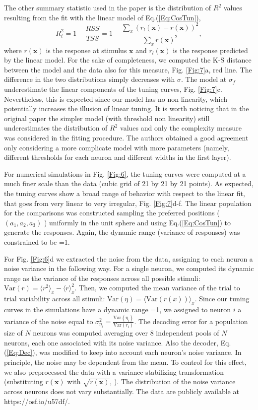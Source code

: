 \documentclass[a4paper]{article}
\begin{document}
The other summary statistic used in the paper is the distribution of $R^2$ values resulting from the fit with the linear model of Eq.(\ref{Eq:CosTun}),
\begin{equation}
R^2_i = 1- \frac{RSS}{TSS} = 1-\frac{\sum_x (r_l(\mathbf{x}) - r(\mathbf{x}))^2}{\sum_x r(\mathbf{x})^2},
\end{equation}
where $r(\mathbf{x})$ is the response at stimulus $\mathbf{x}$ and $r_l(\mathbf{x})$ is the response predicted by the linear model. For the sake of completeness, we computed the K-S distance between the model and the data also for this measure, Fig. \ref{Fig:7}a, red line. The difference in the two distributions simply decreases with $\sigma$. The model at $\sigma_f$ underestimate the linear components of the tuning curves, Fig. \ref{Fig:7}c. Nevertheless, this is expected since our model has no non linearity, which potentially increases the illusion of linear tuning. It is worth noticing that in the original paper the simpler model (with threshold non linearity) still underestimates the distribution of $R^2$ values and only the complexity measure was considered in the fitting procedure. The authors obtained a good agreement only considering  a more complicate model with more parameters (namely, different thresholds for each neuron and different widths in the first layer).

For numerical simulations in Fig. \ref{Fig:6}, the tuning curves were computed at a much finer scale than the data (cubic grid of 21 by 21 by 21 points).  As expected, the tuning curves show a broad range of behavior with respect to the linear fit, that goes from very linear to very irregular, Fig. \ref{Fig:7}d-f.
The linear population for the comparisons was constructed sampling the preferred positions ($(a_1,a_2,a_3)$ ) uniformly in the unit sphere and using Eq.(\ref{Eq:CosTun}) to generate the responses. Again, the dynamic range (variance of responses) was constrained to be =1. 

For Fig. \ref{Fig:6}d we extracted the noise from the data, assigning to each neuron a noise variance in the following way. For a single neuron, we computed its dynamic range as the variance of the responses across all possible stimuli: $\textrm{Var}(r) = \langle r^2 \rangle_x - \langle r\rangle ^2_x$.
Then, we computed the mean variance of the trial to trial variability across all stimuli: $\textrm{Var}(\eta) = \langle \textrm{Var}(r(x))\rangle_x$.
Since our tuning curves in the simulations have a dynamic range =1, we assigned to neuron $i$ a variance of the noise equal to $\sigma_{\eta_i}^2 = \frac{\textrm{Var}(\eta_i)}{\textrm{Var}(r_i)}$.
The decoding error for a population size of $N$ neurons was computed averaging over 8 independent pools  of $N$ neurons, each one associated with its noise variance. Also the decoder, Eq.(\ref{Eq:Dec}), was modified to keep into account each neuron's noise variance.
In principle, the noise may be dependent from the mean. To control for this effect, we also preprocessed the data with a variance stabilizing transformation (substituting $r(\mathbf{x}) $ with $\sqrt{r(\mathbf{x})}$, \cite[]{SRJ1999TheStatistics}). The distribution of the noise variance across neurons does not vary substantially. The data are publicly available at https://osf.io/u57df/.   
\end{document}
